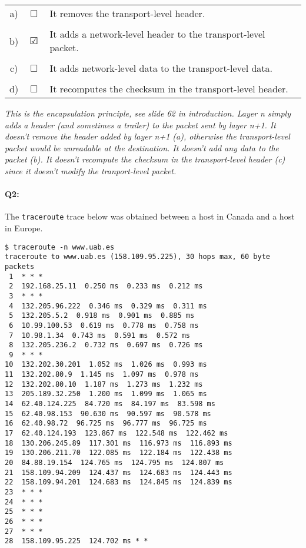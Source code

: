 \documentclass{llncs}
\newcommand{\answer}[1]{{\color{red}\textit{#1}\color{black}}}
\begin{document}
\begin{tabular}{ccl}
  a) & $\Box$ & It removes the transport-level header.\\
  \\
  b) & $\CheckedBox$ & It adds a network-level header to the transport-level packet.\\
  \\
  c) & $\Box$ & It adds network-level data to the transport-level data.\\
  \\
  d) & $\Box$ & It recomputes the checksum in the transport-level header.
\end{tabular}

\answer{This is the encapsulation principle, see slide 62 in
  introduction. Layer n simply adds a header (and sometimes a trailer)
  to the packet sent by layer n+1. It doesn't remove the header added
  by layer n+1 (a), otherwise the transport-level packet would be
  unreadable at the destination. It doesn't add any data to the packet
  (b). It doesn't recompute the checksum in the transport-level header
  (c) since it doesn't modify the tranport-level packet. }

\paragraph{\textbf{Q2:}}
The \texttt{traceroute} trace below was obtained between a host in Canada and a host in Europe. 
\begin{verbatim}
$ traceroute -n www.uab.es
traceroute to www.uab.es (158.109.95.225), 30 hops max, 60 byte packets
 1  * * *
 2  192.168.25.11  0.250 ms  0.233 ms  0.212 ms
 3  * * *
 4  132.205.96.222  0.346 ms  0.329 ms  0.311 ms
 5  132.205.5.2  0.918 ms  0.901 ms  0.885 ms
 6  10.99.100.53  0.619 ms  0.778 ms  0.758 ms
 7  10.98.1.34  0.743 ms  0.591 ms  0.572 ms
 8  132.205.236.2  0.732 ms  0.697 ms  0.726 ms
 9  * * *
10  132.202.30.201  1.052 ms  1.026 ms  0.993 ms
11  132.202.80.9  1.145 ms  1.097 ms  0.978 ms
12  132.202.80.10  1.187 ms  1.273 ms  1.232 ms
13  205.189.32.250  1.200 ms  1.099 ms  1.065 ms
14  62.40.124.225  84.720 ms  84.197 ms  83.598 ms
15  62.40.98.153  90.630 ms  90.597 ms  90.578 ms
16  62.40.98.72  96.725 ms  96.777 ms  96.725 ms
17  62.40.124.193  123.867 ms  122.548 ms  122.462 ms
18  130.206.245.89  117.301 ms  116.973 ms  116.893 ms
19  130.206.211.70  122.085 ms  122.184 ms  122.438 ms
20  84.88.19.154  124.765 ms  124.795 ms  124.807 ms
21  158.109.94.209  124.437 ms  124.683 ms  124.443 ms
22  158.109.94.201  124.683 ms  124.845 ms  124.839 ms
23  * * *
24  * * *
25  * * *
26  * * *
27  * * *
28  158.109.95.225  124.702 ms * *
\end{verbatim}
\end{document}
